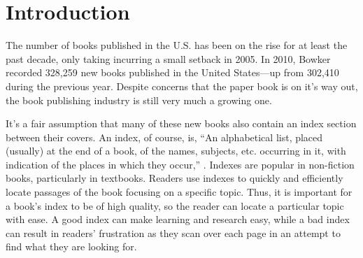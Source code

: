 \section{Introduction}

The number of books published in the U.S. has been on the rise for at least the past decade, only taking incurring a small setback in 2005\cite{bowker}.
In 2010, Bowker recorded 328,259 new books published in the United States---up from 302,410 during the previous year.
Despite concerns that the paper book is on it's way out, the book publishing industry is still very much a growing one.

\begin{center}
\end{center}

It's a fair assumption that many of these new books also contain an index section between their covers.
An index, of course, is, ``An alphabetical list, placed (usually) at the end of a book, of the names, subjects, etc. occurring in it, with indication of the places in which they occur,'' \cite{oed-index}.
Indexes are popular in non-fiction books, particularly in textbooks.
Readers use indexes to quickly and efficiently locate passages of the book focusing on a specific topic.
Thus, it is important for a book's index to be of high quality, so the reader can locate a particular topic with ease.
A good index can make learning and research easy, while a bad index can result in readers' frustration as they scan over each page in an attempt to find what they are looking for.

